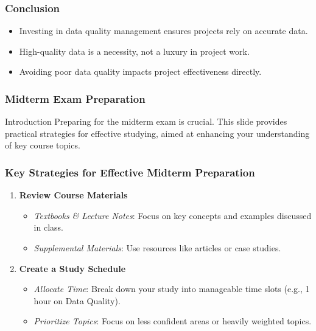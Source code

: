 \documentclass[aspectratio=169]{beamer}
\begin{document}
\begin{frame}
    \frametitle{Conclusion}
    \begin{itemize}
        \item Investing in data quality management ensures projects rely on accurate data.
        \item High-quality data is a necessity, not a luxury in project work.
        \item Avoiding poor data quality impacts project effectiveness directly.
    \end{itemize}
\end{frame}

\begin{frame}[fragile]
    \frametitle{Midterm Exam Preparation}
    \begin{block}{Introduction}
        Preparing for the midterm exam is crucial. This slide provides practical strategies for effective studying, aimed at enhancing your understanding of key course topics.
    \end{block}
\end{frame}

\begin{frame}[fragile]
    \frametitle{Key Strategies for Effective Midterm Preparation}
    \begin{enumerate}
        \item \textbf{Review Course Materials}
            \begin{itemize}
                \item \textit{Textbooks \& Lecture Notes}: Focus on key concepts and examples discussed in class.
                \item \textit{Supplemental Materials}: Use resources like articles or case studies.
            \end{itemize}        
        \item \textbf{Create a Study Schedule}
            \begin{itemize}
                \item \textit{Allocate Time}: Break down your study into manageable time slots (e.g., 1 hour on Data Quality).
                \item \textit{Prioritize Topics}: Focus on less confident areas or heavily weighted topics.
            \end{itemize}
    \end{enumerate}
\end{frame}
\end{document}

